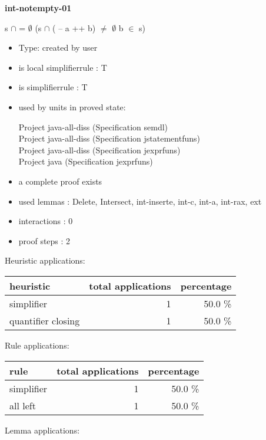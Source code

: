 \documentclass[a4paper]{article}
\begin{document}
{\LARGE\bf int-notempty-01}\label{lemma-int-notempty-01}

\medskip

 \Fol s $\cap$  = $\emptyset$ \Imp (s $\cap$ ( -- a ++ b) $\neq$ $\emptyset$ \Equiv b $\in$ s)

\begin{itemize}

\item Type: created by user

\item is local simplifierrule : T
\item is simplifierrule : T
\item used by units in proved state:

Project java-all-diss (Specification semdl) \\
Project java-all-diss (Specification jstatementfuns) \\
Project java-all-diss (Specification jexprfuns) \\
Project java (Specification jexprfuns)
\item       a complete proof exists
\item       used lemmas  : Delete, Intersect, int-inserte, int-c, int-a, int-rax, ext
\item       interactions : 0
\item       proof steps  : 2
\end{itemize}

\medskip


Heuristic applications:

\begin{supertabular}{l|r|r}
heuristic	& total applications & percentage \\ \hline
simplifier & 1 & 50.0 \% \\
quantifier closing & 1 & 50.0 \% \\

\end{supertabular}

Rule applications:

\begin{supertabular}{l|r|r}
rule	        & total applications & percentage \\ \hline
simplifier & 1 & 50.0 \% \\
all left & 1 & 50.0 \% \\

\end{supertabular}

Lemma applications:
\end{document}
